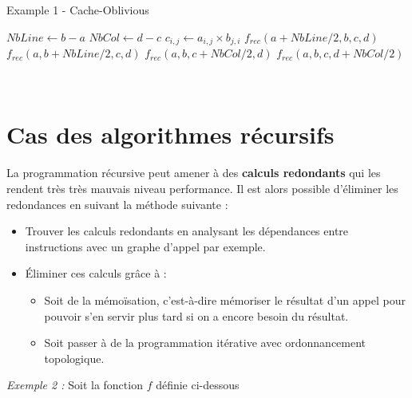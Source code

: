 \documentclass[
  paper=a4,
  ,captions=tableheading
]{scrartcl}
\providecommand{\tightlist}{%
  \setlength{\itemsep}{0pt}\setlength{\parskip}{0pt}}
\begin{document}
\begin{algorithm}[H]
\caption{Example 1 - Cache-Oblivious}
\begin{algorithmic}[3]
\Statex
{}
  \State $NbLine \gets b-a$
  \State $NbCol \gets d-c$
        \State $c_{i,j} \gets a_{i,j} \times b_{j,i}$
      \EndFor
    \EndFor
  \Else
      \State $f_{rec}(a+NbLine/2, b, c, d)$
      \State $f_{rec}(a, b+NbLine/2, c, d)$
    \Else
      \State $f_{rec}(a, b, c+NbCol/2, d)$
      \State $f_{rec}(a, b, c, d+NbCol/2)$
    \EndIf
  \EndIf
\EndFunction
\end{algorithmic}
\end{algorithm}

~

\hypertarget{cas-des-algorithmes-ruxe9cursifs}{%
\section{Cas des algorithmes
récursifs}\label{cas-des-algorithmes-ruxe9cursifs}}

La programmation récursive peut amener à des \textbf{calculs redondants}
qui les rendent très très mauvais niveau performance. Il est alors
possible d'éliminer les redondances en suivant la méthode suivante :

\begin{itemize}
\tightlist
\item
  Trouver les calculs redondants en analysant les dépendances entre
  instructions avec un graphe d'appel par exemple.\\
\item
  Éliminer ces calculs grâce à :

  \begin{itemize}
  \tightlist
  \item
    Soit de la mémoïsation, c'est-à-dire mémoriser le résultat d'un
    appel pour pouvoir s'en servir plus tard si on a encore besoin du
    résultat.
  \item
    Soit passer à de la programmation itérative avec ordonnancement
    topologique.
  \end{itemize}
\end{itemize}

\emph{Exemple 2 :} Soit la fonction \(f\) définie ci-dessous
\end{document}
